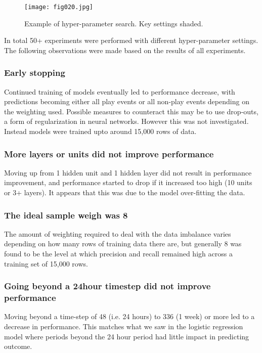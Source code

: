 \begin{figure}[h!]
	\centering
	\texttt{[image: fig020.jpg]}
	\caption{Example of hyper-parameter search. Key settings shaded.}
	\label{fig20}
\end{figure} 


In total 50+ experiments were performed with different hyper-parameter settings. The following observations were made based on the results of all experiments.

\subsubsection{Early stopping}

Continued training of models eventually led to performance decrease, with predictions becoming either all play events or all non-play events depending on the weighting used. Possible measures to counteract this may be to use drop-outs, a form of regularization in neural networks. However this was not investigated. Instead models were trained upto around 15,000 rows of data.

\subsubsection{More layers or units did not improve performance}

Moving up from 1 hidden unit and 1 hidden layer did not result in performance improvement, and performance started to drop if it increased too high (10 units or 3+ layers). It appears that this was due to the model over-fitting the data.
 
\subsubsection{The ideal sample weigh was 8}

The amount of weighting required to deal with the data imbalance varies depending on how many rows of training data there are, but generally 8 was found to be the level at which precision and recall remained high across a training set of 15,000 rows.

\subsubsection{Going beyond a 24hour timestep did not improve performance}

Moving beyond a time-step of 48 (i.e. 24 hours) to 336 (1 week) or more led to a decrease in performance. This matches what we saw in the logistic regression model where periods beyond the 24 hour period had little impact in predicting outcome.

